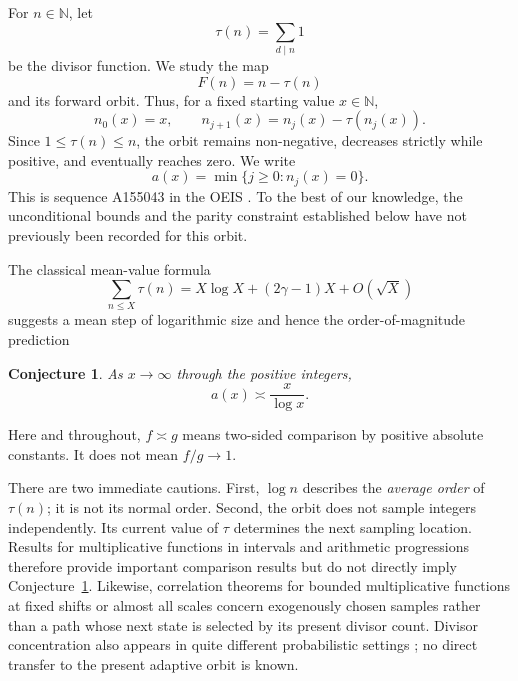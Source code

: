 \documentclass[11pt]{article}
\newtheorem{conjecture}[theorem]{Conjecture}
\theoremstyle{definition}
\theoremstyle{remark}
\newcommand{\N}{\mathbb{N}}
\begin{document}
For $n\in\N$, let
\[
 \tau(n)=\sum_{d\mid n}1
\]
be the divisor function.  We study the map
\[
 F(n)=n-\tau(n)
\]
and its forward orbit.  Thus, for a fixed starting value $x\in\N$,
\begin{equation}\label{eq:orbit}
 n_0(x)=x,\qquad n_{j+1}(x)=n_j(x)-\tau(n_j(x)).
\end{equation}
Since $1\leq\tau(n)\leq n$, the orbit remains non-negative, decreases
strictly while positive, and eventually reaches zero.  We write
\begin{equation}\label{eq:hitting-time}
 a(x)=\min\{j\geq 0:n_j(x)=0\}.
\end{equation}
This is sequence A155043 in the OEIS \cite{OEIS_A155043}.  To the best
of our knowledge, the unconditional bounds and the parity constraint
established below have not previously been recorded for this orbit.

The classical mean-value formula
\begin{equation}\label{eq:mean-tau}
 \sum_{n\leq X}\tau(n)=X\log X+(2\gamma-1)X+O(\sqrt X)
\end{equation}
suggests a mean step of logarithmic size and hence the order-of-magnitude
prediction
\begin{conjecture}\label{conj:main}
As $x\to\infty$ through the positive integers,
\[
 a(x)\asymp \frac{x}{\log x}.
\]
\end{conjecture}
Here and throughout, $f\asymp g$ means two-sided comparison by positive
absolute constants.  It does not mean $f/g\to 1$.

There are two immediate cautions.  First, $\log n$ describes the
\emph{average order} of $\tau(n)$; it is not its normal order.  Second,
the orbit does not sample integers independently.  Its current value of
$\tau$ determines the next sampling location.  Results for multiplicative
functions in intervals and arithmetic progressions
\cite{Shiu1980,MatomakiRadziwill2016,KlurmanMangerel2023,Mangerel2023,MatomakiRadziwillShaoTaoTeravainen2026}
therefore provide important comparison results but do not directly imply
Conjecture~\ref{conj:main}.
Likewise, correlation theorems for bounded multiplicative functions at
fixed shifts or almost all scales
\cite{MatomakiRadziwillTao2015,Tao2016,TaoTeravainen2019}
concern exogenously chosen samples rather than a path whose next state is
selected by its present divisor count.  Divisor concentration also
appears in quite different probabilistic settings
\cite{FordGreenKoukoulopoulos2023}; no direct transfer to the present
adaptive orbit is known.
\end{document}
